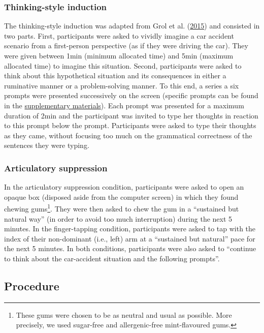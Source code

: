 \documentclass[a4paper,12pt,twoside,openright,oldfontcommands,final]{memoir}
\let\rmarkdownfootnote\footnote%
\def\footnote{\protect\rmarkdownfootnote}
\begin{document}
\hypertarget{thinking-style-induction}{%
\subsubsection{Thinking-style induction}\label{thinking-style-induction}}

The thinking-style induction was adapted from Grol et al. (\protect\hyperlink{ref-grol_effects_2015}{2015}) and consisted in two parts. First, participants were asked to vividly imagine a car accident scenario from a first-person perspective (as if they were driving the car). They were given between 1min (minimum allocated time) and 5min (maximum allocated time) to imagine this situation. Second, participants were asked to think about this hypothetical situation and its consequences in either a ruminative manner or a problem-solving manner. To this end, a series a six prompts were presented successively on the screen (specific prompts can be found in the \protect\hyperlink{supp}{supplementary materials}). Each prompt was presented for a maximum duration of 2min and the participant was invited to type her thoughts in reaction to this prompt below the prompt. Participants were asked to type their thoughts as they came, without focusing too much on the grammatical correctness of the sentences they were typing.

\hypertarget{articulatory-suppression}{%
\subsubsection{Articulatory suppression}\label{articulatory-suppression}}

In the articulatory suppression condition, participants were asked to open an opaque box (disposed aside from the computer screen) in which they found chewing gums\footnote{These gums were chosen to be as neutral and usual as possible. More precisely, we used sugar-free and allergenic-free mint-flavoured gums.}. They were then asked to chew the gum in a \enquote{sustained but natural way} (in order to avoid too much interruption) during the next 5 minutes. In the finger-tapping condition, participants were asked to tap with the index of their non-dominant (i.e., left) arm at a \enquote{sustained but natural} pace for the next 5 minutes. In both conditions, participants were also asked to \enquote{continue to think about the car-accident situation and the following prompts}.

\hypertarget{procedure-4}{%
\subsection{Procedure}\label{procedure-4}}
\end{document}
